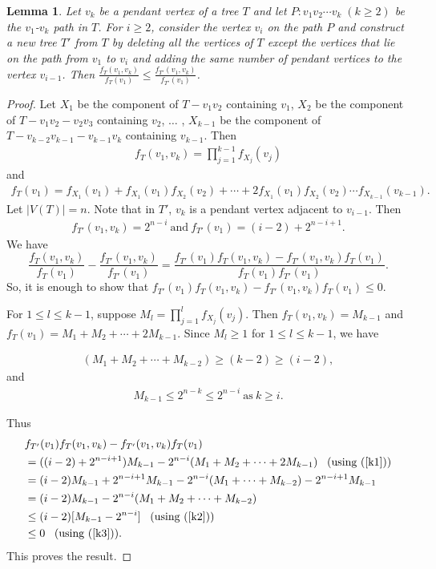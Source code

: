 \documentclass[11pt]{article}
\newtheorem{lemma}[theorem]{Lemma}
\begin{document}
\begin{lemma} \label{lem4}
Let $v_k$ be a pendant vertex of a tree $T$ and let $P:v_1v_2\cdots v_k \;(k\geq 2)$ be the $v_1$-$v_k$ path in $T$. For $i\geq 2$, consider the vertex $v_i$ on the path $P$ and construct a new tree $T'$ from $T$ by deleting all the vertices of $T$ except the vertices that lie on the path from $v_1$ to $v_i$ and adding the same number of pendant vertices to the vertex $v_{i-1}$. Then $\frac{f_T(v_1,v_k)}{f_T(v_1)} \leq \frac{f_{T'}(v_1,v_k)}{f_{T'}(v_1)}$.
\end{lemma}
\begin{proof}
 Let $X_1$ be the component of $T-v_1v_2$ containing $v_1$, $X_2$ be the component of  $T-v_1v_2-v_2v_3$ containing $v_2$, $\ldots$ , $X_{k-1}$ be the component of  $T-v_{k-2}v_{k-1}-v_{k-1}v_k$ containing $v_{k-1}$. Then 
\begin{align*}
    f_T(v_1,v_k)=\prod_{j=1}^{k-1} f_{X_j}(v_j)
\end{align*}
and
\begin{align*}
     f_T(v_1)=f_{X_1}(v_1)+f_{X_1}(v_1)f_{X_2}(v_2)+\cdots+2f_{X_1}(v_1)f_{X_2}(v_2)\cdots f_{X_{k-1}}(v_{k-1}).
\end{align*}
Let $|V(T)|=n$. Note that in $T'$, $v_k$ is a pendant vertex adjacent to $v_{i-1}$. Then
\begin{align}\label{k1}
  f_{T'}(v_1,v_k)=2^{n-i} \ \mbox{and} \ 
  f_{T'}(v_1)=(i-2)+2^{n-i+1}.  
\end{align}
We have $$\frac{f_T(v_1,v_k)}{f_T(v_1)} - \frac{f_{T'}(v_1,v_k)}{f_{T'}(v_1)}=\frac{f_{T'}(v_1)f_T(v_1,v_k)-f_{T'}(v_1,v_k)f_T(v_1)}{f_T(v_1)f_{T'}(v_1)}.$$ So, it is enough to show that $f_{T'}(v_1)f_T(v_1,v_k)-f_{T'}(v_1,v_k)f_T(v_1)\leq 0$.

For $1\leq l \leq k-1$, suppose $M_l=\prod_{j=1}^{l} f_{X_j}(v_j)$. Then $f_T(v_1,v_k)=M_{k-1}$ and $f_T(v_1)=M_1+M_2+\cdots+2M_{k-1}.$  Since $M_l\geq 1$ for $1\leq l \leq k-1$,  we have

\begin{align}\label{k2}
(M_1+M_2+\cdots+M_{k-2})\geq (k-2)\geq (i-2),
\end{align}
and
\begin{align}\label{k3}
 M_{k-1}\leq 2^{n-k}\leq 2^{n-i} \ \mbox{as} \ k\geq i.
\end{align}

Thus
\begin{align*} 
&f_{T'}(v_1)f_T(v_1,v_k)-f_{T'}(v_1,v_k)f_T(v_1)\\
&=((i-2)+2^{n-i+1})M_{k-1}- 2^{n-i}(M_1+M_2+\cdots+2M_{k-1})\;\;\;\mbox{(using (\ref{k1}))}\\
&=(i-2)M_{k-1}+2^{n-i+1}M_{k-1}-2^{n-i}(M_1+\cdots+M_{k-2})-2^{n-i+1}M_{k-1}\\
&=(i-2)M_{k-1}-2^{n-i}(M_1+M_2+\cdots+M_{k-2})\\
& \leq (i-2)[M_{k-1}-2^{n-i}]\;\;\;\mbox{(using (\ref{k2}))}\\
&\leq 0 \;\;\;\mbox{(using (\ref{k3}))}.
\end{align*} 
This proves the result.
\end{proof}
\end{document}
